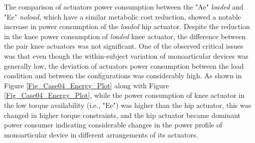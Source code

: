 \documentclass[10pt,letterpaper]{article}
\begin{document}
The comparison of actuators power consumption between the "Ae" {\it loaded} and "Ee" {\it noload}, which have a similar metabolic cost reduction, showed a notable increase in power consumption of the {\it loaded} hip actuator. Despite the reduction in the knee power consumption of {\it loaded} knee actuator, the difference between the pair knee actuators was not significant. One of the observed critical issues was that even though the within-subject variation of monoarticular devices was generally low, the deviation of actuators power consumption between the load condition and between the configurations was considerably high. As shown in Figure \ref{Fig_Case04_Energy_Plot} along with Figure \ref{Fig_Case04_Energy_Plot}, while the power consumption of knee actuator in the low torque availability (i.e., "Ee") was higher than the hip actuator, this was changed in higher torque constraints, and the hip actuator became dominant power consumer indicating considerable changes in the power profile of monoarticular device in different arrangements of its actuators.\\
\end{document}
